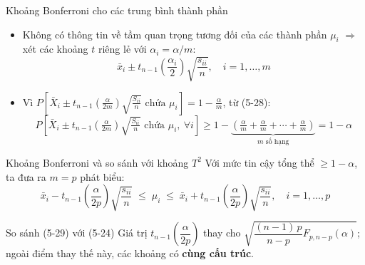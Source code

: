 \begin{frame}{Khoảng Bonferroni cho các trung bình thành phần}
  \begin{itemize}
    \item Không có thông tin về tầm quan trọng tương đối của các thành phần $\mu_i$ $\Rightarrow$ xét các khoảng $t$ riêng lẻ với $\alpha_i = \alpha/m$:
    \[
      \bar{x}_i \pm t_{n-1}\!\left(\frac{\alpha_i}{2}\right)\sqrt{\frac{s_{ii}}{n}}, \quad i=1,\ldots,m
      \tag{$*7$}
    \]
    \item Vì $P\!\left[\bar{X}_i \pm t_{n-1}\!\left(\frac{\alpha}{2m}\right)\sqrt{\frac{S_{ii}}{n}} \text{ chứa } \mu_i\right] = 1-\frac{\alpha}{m}$, từ (5-28):
    \[
      P\!\left[\bar{X}_i \pm t_{n-1}\!\left(\tfrac{\alpha}{2m}\right)\sqrt{\tfrac{S_{ii}}{n}} \text{ chứa } \mu_i,\ \forall i\right]
      \ge 1 - \underbrace{\left(\tfrac{\alpha}{m}+\tfrac{\alpha}{m}+\cdots+\tfrac{\alpha}{m}\right)}_{m \text{ số hạng}} = 1-\alpha
      \tag{$*8$}
    \]
  \end{itemize}
\end{frame}
 
\begin{frame}{Khoảng Bonferroni và so sánh với khoảng $T^2$}
  Với mức tin cậy tổng thể $\ge 1-\alpha$, ta đưa ra $m=p$ phát biểu:
  \begin{equation*}
    \bar{x}_i - t_{n-1}\!\left(\frac{\alpha}{2p}\right)\sqrt{\frac{s_{ii}}{n}} \;\le\; \mu_i \;\le\; \bar{x}_i + t_{n-1}\!\left(\frac{\alpha}{2p}\right)\sqrt{\frac{s_{ii}}{n}}, \quad i=1,\dots,p \tag{5-29}
  \end{equation*}
  \begin{block}{So sánh (5-29) với (5-24)}
    Giá trị $t_{n-1}\!\left(\dfrac{\alpha}{2p}\right)$ thay cho $\sqrt{\dfrac{(n-1)\,p}{n-p}F_{p,n-p}(\alpha)}$; ngoài điểm thay thế này, các khoảng có \textbf{cùng cấu trúc}.
  \end{block}
\end{frame}
 
